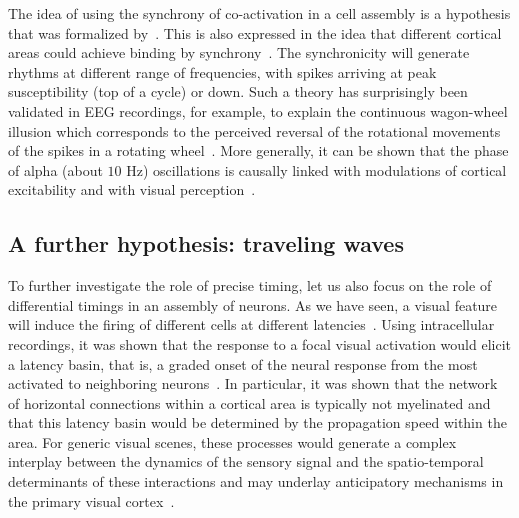 \documentclass[brainsci, %
               review,submit,pdftex,moreauthors%
               ]{Definitions/mdpi}
\begin{document}
The idea of using the synchrony of co-activation in a cell assembly is a hypothesis that was formalized by~\citet{hebb_organization_1949}. 
This is also expressed in the idea that different cortical areas could achieve binding by synchrony~\citep{fries_mechanism_2005}. The synchronicity will generate rhythms at different range of frequencies, with spikes arriving at peak susceptibility (top of a cycle) or down. Such a theory has surprisingly been validated in EEG recordings, for example, to explain the continuous wagon-wheel illusion which corresponds to the perceived reversal of the rotational movements of the spikes in a rotating wheel~\citep{vanrullen_continuous_2006}. More generally, it can be shown that the phase of alpha (about $10$ Hz) oscillations  is causally linked with modulations of cortical excitability and with visual perception~\citep{dugue_phase_2011}. 
%
\subsection{A further hypothesis: traveling waves}
To further investigate the role of precise timing, let us also focus on the role of differential timings in an assembly of neurons. As we have seen, a visual feature will induce the firing of different cells at different latencies~\citep{celebrini_dynamics_1993}. Using intracellular recordings, it was shown that the response to a focal visual activation would elicit a latency basin, that is, a graded onset of the neural response from the most activated to neighboring neurons~\citep{bringuier_horizontal_1999}. In particular, it was shown that the network of horizontal connections within a cortical area is typically not myelinated and that this latency basin would be determined by the propagation speed within the area. For generic visual scenes, these processes would generate a complex interplay between the dynamics of the sensory signal and the spatio-temporal determinants of these interactions and may underlay anticipatory mechanisms in the primary visual cortex~\citep{benvenuti_anticipatory_2020,le_bec_horizontal_2022}.
%
\end{document}
